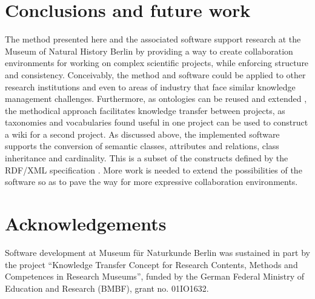 \documentclass{ijcs_template}
\begin{document}
\section{Conclusions and future work}
The method presented here and the associated software support research at the Museum of Natural History Berlin by providing a way to create collaboration environments for working on complex scientific projects, while enforcing structure and consistency. Conceivably, the method and software could be applied to other research institutions and even to areas of industry that face similar knowledge management challenges. Furthermore, as ontologies can be reused and extended \cite{noy2001}, the methodical approach facilitates knowledge transfer between projects, as taxonomies and vocabularies found useful in one project can be used to construct a wiki for a second project. As discussed above, the implemented software supports the conversion of semantic classes, attributes and relations, class inheritance and cardinality. This is a subset of the constructs defined by the RDF/XML specification \cite{musen2015}. More work is needed to extend the possibilities of the software so as to pave the way for more expressive collaboration environments.

\section{Acknowledgements}
Software development at Museum f\"ur Naturkunde Berlin was sustained in part by the project ``Knowledge Transfer Concept for Research Contents, Methods and Competences in Research Museums'', funded by the German Federal Ministry of Education and Research (BMBF), grant no. 01IO1632.
\end{document}

